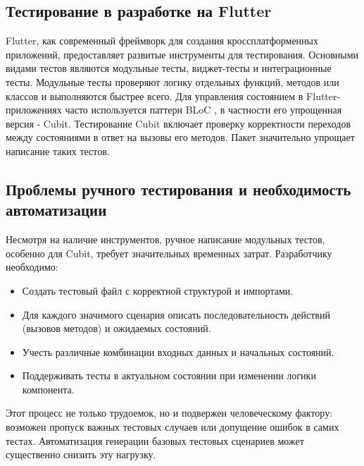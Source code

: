\documentclass[14pt, russian]{scrartcl}
\begin{document}
\subsection{Тестирование в разработке на Flutter}
Flutter, как современный фреймворк для создания кроссплатформенных приложений, предоставляет развитые инструменты для тестирования. Основными видами тестов являются модульные  тесты, виджет-тесты и интеграционные тесты. Модульные тесты проверяют логику отдельных функций, методов или классов и выполняются быстрее всего. Для управления состоянием в Flutter-приложениях часто используется паттерн BLoC , в частности его упрощенная версия - Cubit. Тестирование Cubit включает проверку корректности переходов между состояниями в ответ на вызовы его методов. Пакет  значительно упрощает написание таких тестов.

\subsection{Проблемы ручного тестирования и необходимость автоматизации}

Несмотря на наличие инструментов, ручное написание модульных тестов, особенно для Cubit, требует значительных временных затрат. Разработчику необходимо:
\begin{itemize}
    \item Создать тестовый файл с корректной структурой и импортами.
    \item Для каждого значимого сценария описать последовательность действий (вызовов методов) и ожидаемых состояний.
    \item Учесть различные комбинации входных данных и начальных состояний.
    \item Поддерживать тесты в актуальном состоянии при изменении логики компонента.
\end{itemize}
Этот процесс не только трудоемок, но и подвержен человеческому фактору: возможен пропуск важных тестовых случаев или допущение ошибок в самих тестах. Автоматизация генерации базовых тестовых сценариев может существенно снизить эту нагрузку.
\end{document}
